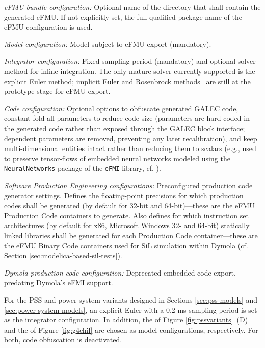 \squishlist
    \item \textit{eFMU bundle configuration:} Optional name of the directory that shall contain the generated eFMU. If not explicitly set, the full qualified package name of the eFMU configuration is used.
    \item \textit{Model configuration:} Model subject to eFMU export (mandatory).
    \item \textit{Integrator configuration:} Fixed sampling period (mandatory) and optional solver method for inline-integration. The only mature solver currently supported is the explicit Euler method; implicit Euler and Rosenbrock methods~\cite{Olsson2017Rosenbrock} are still at the prototype stage for eFMU export.
    \item \textit{Code configuration:} Optional options to obfuscate generated GALEC code, constant-fold all parameters to reduce code size (parameters are hard-coded in the generated code rather than exposed through the GALEC block interface; dependent parameters are removed, preventing any later recalibration), and keep multi-dimensional entities intact rather than reducing them to scalars (e.g., used to preserve tensor-flows of embedded neural networks modeled using the \texttt{NeuralNetworks} package of the \texttt{eFMI} library, cf. \cite{Kamp2025}).
    \item \textit{Software Production Engineering configurations:} Preconfigured production code generator settings. Defines the floating-point precisions for which production codes shall be generated (by default for 32-bit and 64-bit)---these are the eFMU Production Code containers to generate. Also defines for which instruction set architectures (by default for x86, Microsoft\regtm{} Windows\regtm{} 32- and 64-bit) statically linked libraries shall be generated for each Production Code container---these are the eFMU Binary Code containers used for SiL simulation within Dymola (cf. Section \ref{sec:modelica-based-sil-tests}).
    \item \textit{Dymola production code configuration:} Deprecated embedded code export, predating Dymola's eFMI support.
\squishend

\noindent{}For the PSS and power system variants designed in Sections \ref{sec:pss-models} and \ref{sec:power-system-models}, an explicit Euler with a 0.2 ms sampling period is set as the integrator configuration. In addition, the \controller{} of Figure \ref{fig:pssvariants}~(D) and the \plant{} of Figure \ref{fig:g4chil} are chosen as model configurations, respectively. For both, code obfuscation is deactivated.

